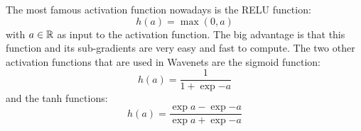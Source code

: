 The most famous activation function nowadays is the RELU function:
\begin{equation}\label{eq:nn_theory_relu}
  h(a) = \max{(0, a)}
\end{equation}
with $a \in \mathbb{R}$ as input to the activation function.
The big advantage is that this function and its sub-gradients are very easy and fast to compute.
The two other activation functions that are used in Wavenets are the sigmoid function:
\begin{equation}\label{eq:nn_theory_sigmoid}
  h(a) = \frac{1}{1 + \exp{-a}}
\end{equation}
and the tanh functions:
\begin{equation}\label{eq:nn_theory_tanh}
  h(a) = \frac{\exp{a} - \exp{-a}}{\exp{a} + \exp{-a}}
\end{equation}



